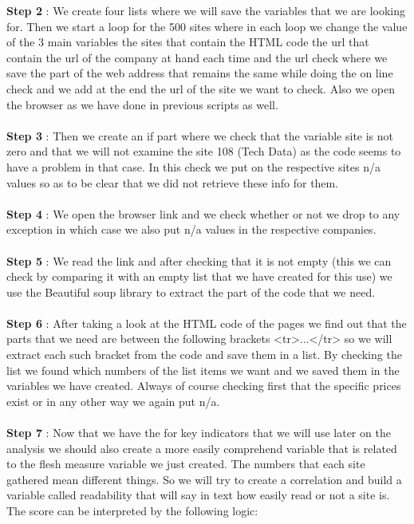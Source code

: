 \documentclass{book}
\begin{document}
\textbf{Step 2} : We create four lists where we will save the variables that we are looking for. Then we start a loop for the 500 sites where in each loop we change the value of the 3 main variables the sites that contain the HTML code the url that contain the url of the company at hand each time and the url check where we save the part of the web address that remains the same while doing the on line check and we add at the end the url of the site we want to check. Also we open the browser as we have done in previous scripts as well.\\\\
\textbf{Step 3} : Then we create an if part where we check that the variable site is not zero and that we will not examine the site 108 (Tech Data) as the code seems to have a problem in that case. In this check we put on the respective sites n/a values so as to be clear that we did not retrieve these info for them.\\\\
\textbf{Step 4} : We open the browser link and we check whether or not we drop to any exception in which case we also put n/a values in the respective companies.\\\\
\textbf{Step 5} : We read the link and after checking that it is not empty (this we  can check by comparing it with an empty list that we have created for this use) we use the Beautiful soup library to extract the part of the code that we need.\\\\
\textbf{Step 6} : After taking a look at the HTML code of the pages we find out that the parts that we need are between the following brackets <tr>...</tr> so we will extract each such bracket from the code and save them in a list. By checking the list we found which numbers of the list items we want and we saved them in the variables we have created. Always of course checking first that the specific prices exist or in any other way we again put n/a.\\\\
\textbf{Step 7} : Now that we have the for key indicators that we will use later on the analysis we should also create a more easily comprehend variable that is related to the flesh measure variable we just created. The numbers that each site gathered mean different things. So we will try to create a correlation and build a variable called readability that will say in text how easily read or not a site is. The score can be interpreted by the following logic:
\end{document}
